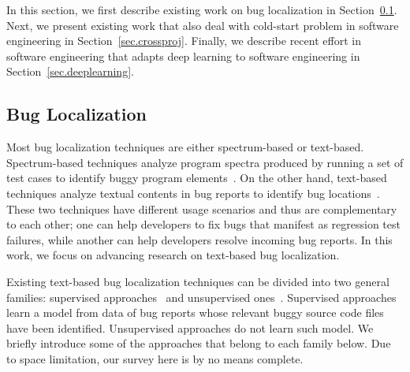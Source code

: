In this section, we first describe existing work on bug localization in Section~\ref{sec.bugloc}. Next, we present existing work that also deal with cold-start problem in software engineering in Section~\ref{sec.crossproj}. Finally, we describe recent effort in software engineering that adapts deep learning to software engineering in Section~\ref{sec.deeplearning}.

\subsection{Bug Localization}\label{sec.bugloc}


Most bug localization techniques are either spectrum-based or text-based. Spectrum-based techniques analyze program spectra produced by running a set of test cases to identify buggy program elements~\cite{JonesH05,LeLGG16,SohnY17,ZhangLZK17}. On the other hand, text-based techniques analyze textual contents in bug reports to identify bug locations~\cite{lukins2008source,rao2011retrieval,SahaLKP13,SahaLKP14,zhou2012should,huo2016learning}. These two techniques have different usage scenarios and thus are complementary to each other; one can help developers to fix bugs that manifest as regression test failures, while another can help developers resolve incoming bug reports. In this work, we focus on advancing research on text-based bug localization.

Existing text-based bug localization techniques can be divided into two general families: supervised approaches~\cite{zhou2012should,huo2016learning} and unsupervised ones~\cite{lukins2008source,rao2011retrieval,SahaLKP13,SahaLKP14}. Supervised approaches learn a model from data of bug reports whose relevant buggy source code files have been identified. Unsupervised approaches do not learn such model. We briefly introduce some of the approaches that belong to each family below. Due to space limitation, our survey here is by no means complete.

